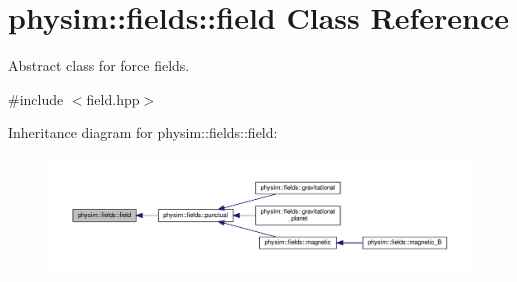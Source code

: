 \hypertarget{classphysim_1_1fields_1_1field}{}\section{physim\+:\+:fields\+:\+:field Class Reference}
\label{classphysim_1_1fields_1_1field}


Abstract class for force fields.  




{\ttfamily \#include $<$field.\+hpp$>$}



Inheritance diagram for physim\+:\+:fields\+:\+:field\+:\nopagebreak
\begin{figure}[H]
\begin{center}
\leavevmode
\includegraphics[width=350pt]{classphysim_1_1fields_1_1field__inherit__graph}
\end{center}
\end{figure}
